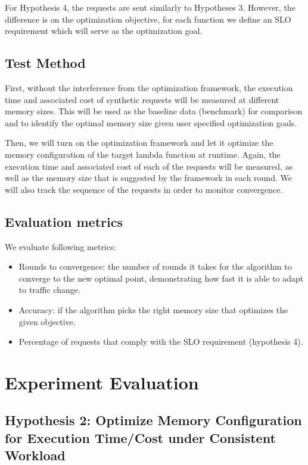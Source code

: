 \documentclass[conference]{IEEEtran}
\begin{document}
For Hypothesis 4, the requests are sent similarly to Hypotheses 3. However, the difference is on the optimization objective, for each function we define an SLO requirement which will serve as the optimization goal.

\subsection{Test Method}

First, without the interference from the optimization framework, the execution time and associated cost of synthetic requests will be measured at different memory sizes. This will be used as the baseline data (benchmark) for comparison and to identify the optimal memory size given user specified optimization goals.

Then, we will turn on the optimization framework and let it optimize the memory configuration of the target lambda function at runtime. Again, the execution time and associated cost of each of the requests will be measured, as well as the memory size that is suggested by the framework in each round. We will also track the sequence of the requests in order to monitor convergence.

\subsection{Evaluation metrics}

We evaluate following metrics:

\begin{itemize}
    \item Rounds to convergence: the number of rounds it takes for the algorithm to converge to the new optimal point, demonstrating how fast it is able to adapt to traffic change.
    \item Accuracy: if the algorithm picks the right memory size that optimizes the given objective. 
    \item Percentage of requests that comply with the SLO requirement (hypothesis 4).
\end{itemize}


\section{Experiment Evaluation}

\subsection{Hypothesis 2: Optimize Memory Configuration for Execution Time/Cost under Consistent Workload}
\end{document}
